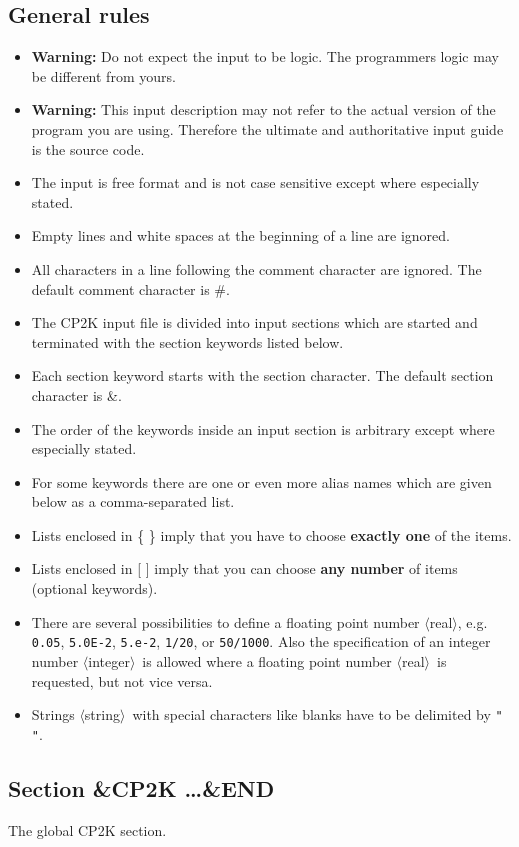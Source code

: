 \documentclass[12pt,twoside]{article}
\newcommand{\kf}{\tt} %
\newcommand{\kw}[1]{{\kf #1}} %
\newcommand{\isr}[1]{\index{input sections, required!\kw{#1}}}
\newcommand{\bi}{\begin{itemize}}
\newcommand{\ei}{\end{itemize}}
\newcommand{\la}{$\langle$}
\newcommand{\ra}{$\rangle$}
\begin{document}
\subsection{General rules}
%
\bi
 \item {\bf Warning:} Do not expect the input to be logic.
       The programmers logic may be different from yours.
 \item {\bf Warning:} This input description may not refer to the
       actual version of the program you are using. Therefore the
       ultimate and authoritative input guide is the source code.
 \item The input is free format and is not case sensitive except where
       especially stated.
 \item Empty lines and white spaces at the beginning of a line are ignored.
 \item All characters in a line following the comment character are ignored.
       The default comment character is \#.
 \item The CP2K input file is divided into input sections which are started
       and terminated with the section keywords listed below.
 \item Each section keyword starts with the section character.
       The default section character is \&.
 \item The order of the keywords inside an input section is arbitrary
       except where especially stated.
 \item For some keywords there are one or even more alias names which are
       given below as a comma-separated list.
 \item Lists enclosed in \{ \} imply that you have to choose
       {\bf exactly one} of the items.
 \item Lists enclosed in [ ] imply that you can choose
       {\bf any number} of items (optional keywords).
 \item There are several possibilities to define a floating point number
       \la real\ra, e.g. {\tt 0.05}, {\tt 5.0E-2}, {\tt 5.e-2},
       {\tt 1/20}, or {\tt 50/1000}. Also the specification of an
       integer number \la integer\ra\ is allowed where a floating point
       number \la real\ra\ is requested, but not vice versa.
 \item Strings \la string\ra\ with special characters like blanks have
       to be delimited by \kw{" "}.
\ei
%
\subsection{Section \&CP2K \ldots \&END}
\isr{\&CP2K}
%
The global CP2K section.
%
\end{document}
